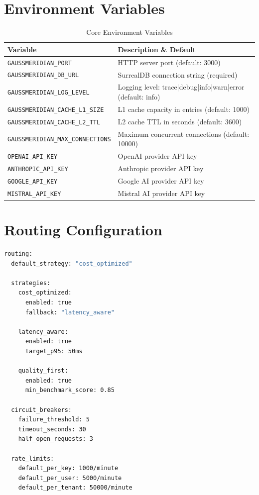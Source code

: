 \documentclass[12pt,a4paper,twoside]{report}
\begin{document}
\section{Environment Variables}

\begin{table}[h]
\centering
\small
\begin{tabular}{@{}p{4.5cm}p{7cm}@{}}
\toprule
\textbf{Variable} & \textbf{Description \& Default} \\
\midrule
\texttt{GAUSSMERIDIAN\_PORT} & HTTP server port (default: 3000) \\
\texttt{GAUSSMERIDIAN\_DB\_URL} & SurrealDB connection string (required) \\
\texttt{GAUSSMERIDIAN\_LOG\_LEVEL} & Logging level: trace|debug|info|warn|error (default: info) \\
\texttt{GAUSSMERIDIAN\_CACHE\_L1\_SIZE} & L1 cache capacity in entries (default: 1000) \\
\texttt{GAUSSMERIDIAN\_CACHE\_L2\_TTL} & L2 cache TTL in seconds (default: 3600) \\
\texttt{GAUSSMERIDIAN\_MAX\_CONNECTIONS} & Maximum concurrent connections (default: 10000) \\
\texttt{OPENAI\_API\_KEY} & OpenAI provider API key \\
\texttt{ANTHROPIC\_API\_KEY} & Anthropic provider API key \\
\texttt{GOOGLE\_API\_KEY} & Google AI provider API key \\
\texttt{MISTRAL\_API\_KEY} & Mistral AI provider API key \\
\bottomrule
\end{tabular}
\caption{Core Environment Variables}
\label{tab:env-vars}
\end{table}

\section{Routing Configuration}

\begin{lstlisting}[language=bash,caption={Example routing configuration (YAML)}]
routing:
  default_strategy: "cost_optimized"
  
  strategies:
    cost_optimized:
      enabled: true
      fallback: "latency_aware"
    
    latency_aware:
      enabled: true
      target_p95: 50ms
    
    quality_first:
      enabled: true
      min_benchmark_score: 0.85

  circuit_breakers:
    failure_threshold: 5
    timeout_seconds: 30
    half_open_requests: 3

  rate_limits:
    default_per_key: 1000/minute
    default_per_user: 5000/minute
    default_per_tenant: 50000/minute
\end{lstlisting}
\end{document}
